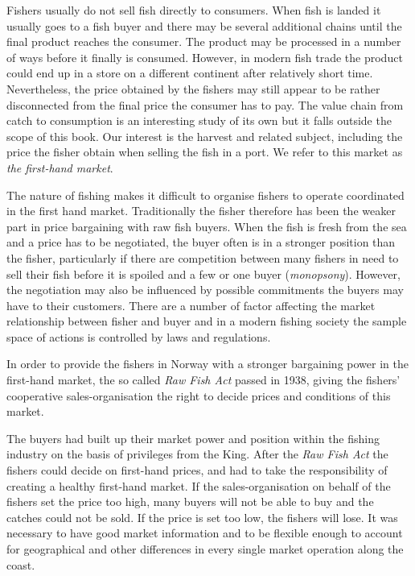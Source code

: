 \documentclass[11pt,fleqn]{book} %
\begin{document}
\begin{corollary} \label{highlight:rawfishact}
\hfill \break
\small{\indent Fishers usually do not sell fish directly to consumers. When fish is landed it usually goes to a fish buyer and there may be several additional chains until the final product reaches the consumer. The product may be processed in a number of ways before it finally is consumed. However, in modern fish trade the product could end up in a store on a different continent after relatively short time. Nevertheless, the price obtained by the fishers may still appear to be rather disconnected from the final price the consumer has to pay. The value chain from catch to consumption is an interesting study of its own but it falls outside the scope of this book. Our interest is the harvest and related subject, including the price the fisher obtain when selling the fish in a port. We refer to this market as \textit{the first-hand market}.

The nature of fishing makes it difficult to organise fishers to operate coordinated in the first hand market. Traditionally the fisher therefore has been the weaker part in price bargaining with raw fish buyers. When the fish is fresh from the sea and a price has to be negotiated, the buyer often is in a stronger position than the fisher, particularly if there are competition between many fishers in need to sell their fish before it is spoiled and a few or one buyer (\textit{monopsony}). However, the negotiation may also be influenced by possible commitments the buyers may have to their customers. There are a number of factor affecting the market relationship between fisher and buyer and in a modern fishing society the sample space of actions is controlled by laws and regulations.

In order to provide the fishers in Norway with a stronger bargaining power in the first-hand market, the so called \textit{Raw Fish Act} passed in 1938, giving the fishers' cooperative sales-organisation the right to decide prices and conditions of this market\cite{Jentoft2018BuildingNorway}. 

The buyers had built up their market power and position within the fishing industry on the basis of privileges from the King. After the \textit{Raw Fish Act} the fishers could decide on first-hand prices, and had to take the responsibility of creating a healthy first-hand market. If the sales-organisation on behalf of the fishers set the price too high, many buyers will not be able to buy and the catches could not be sold. If the price is set too low, the fishers will lose. It was necessary to have good market information and to be flexible enough to account for geographical and other differences in every single market operation along the coast. 

}
\end{corollary}
\end{document}
